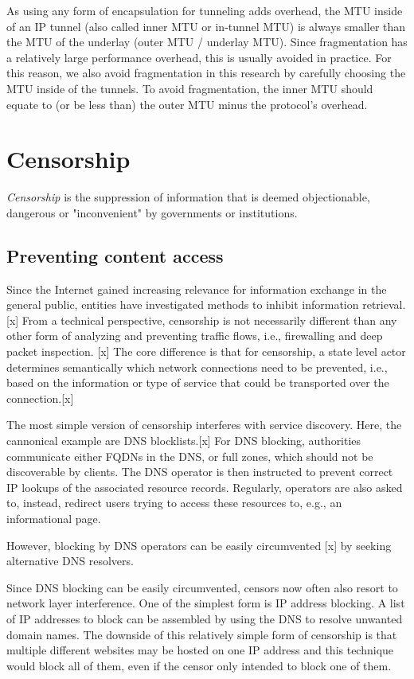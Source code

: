 As using any form of encapsulation for tunneling adds overhead, the MTU inside of an IP tunnel (also called inner MTU or in-tunnel MTU) is always smaller than the MTU of the underlay (outer MTU / underlay MTU).
Since fragmentation has a relatively large performance overhead, this is usually avoided in practice.
For this reason, we also avoid fragmentation in this research by carefully choosing the MTU inside of the tunnels.
To avoid fragmentation, the inner MTU should equate to (or be less than) the outer MTU minus the protocol's overhead.


\section{Censorship}
\textit{Censorship} \cite{wiki:Censorship} is the suppression of information that is deemed objectionable, dangerous or "inconvenient" by governments or institutions.

\subsection{Preventing content access}

Since the Internet gained increasing relevance for information exchange in the general public, entities have investigated methods to inhibit information retrieval.[x]
From a technical perspective, censorship is not necessarily different than any other form of analyzing and preventing traffic flows, i.e., firewalling and deep packet inspection. [x]
The core difference is that for censorship, a state level actor determines semantically which network connections need to be prevented, i.e., based on the information or type of service that could be transported over the connection.[x]

The most simple version of censorship interferes with service discovery.
Here, the cannonical example are DNS blocklists.[x]
For DNS blocking, authorities communicate either FQDNs in the DNS, or full zones, which should not be discoverable by clients.
The DNS operator is then instructed to prevent correct IP lookups of the associated resource records.
Regularly, operators are also asked to, instead, redirect users trying to access these resources to, e.g., an informational page.

However, blocking by DNS operators can be easily circumvented [x] by seeking alternative DNS resolvers.

Since DNS blocking can be easily circumvented, censors now often also resort to network layer interference.
One of the simplest form is IP address blocking.
A list of IP addresses to block can be assembled by using the DNS to resolve unwanted domain names.
The downside of this relatively simple form of censorship is that multiple different websites may be hosted on one IP address and this technique would block all of them, even if the censor only intended to block one of them.

